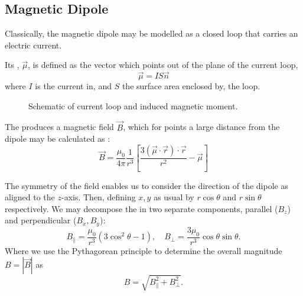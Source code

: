 \subsection{Magnetic Dipole}
Classically, the magnetic dipole may be modelled as a closed loop that carries an
electric current. 

Its , $\vec{\mu}$, is defined as the vector which points out of the plane
of the current loop, 
\begin{equation}
    \vec{\mu} = IS \vec{n}
    \label{eq:dipole_moment}
\end{equation}
where $I$ is the current in, and $S$ the surface area enclosed by, the loop. 

\begin{wrapfigure}{l}{0.5\textwidth}%
    \centering%
        
  \caption{Schematic of current loop and induced magnetic moment.}%
\end{wrapfigure}%


The  produces a magnetic field $\vec{B}$, which for points a large distance from the dipole may be calculated as \cite{Griffiths2012-pt}:
\begin{equation}
    \vec{B} = \frac{\mu_0}{4\pi} \frac{1}{r^3} \left[\frac{3(\vec{\mu} \cdot \vec{r}) \cdot \vec{r}}{r^2} - \vec{\mu}\right]
    \label{eq:}
\end{equation}

The symmetry of the field enables us to consider the direction of the dipole as aligned to the $z$-axis. Then, defining $x,y$ as usual by $r \cos\theta$ and $r \sin\theta$ respectively. We may decompose the  in two separate components, parallel ($B_z$) and perpendicular ($B_x, B_y$): 
$$B_\parallel =\frac{\mu_0}{r^3}(3\cos^2 \theta - 1), \quad B_\perp = \frac{3\mu_0}{r^3}\cos\theta\sin\theta.$$
Where we use the Pythagorean principle to determine the overall magnitude $B = |\vec{B}|$ as
$$B = \sqrt{B_\parallel^2 + B_\perp^2}.$$
